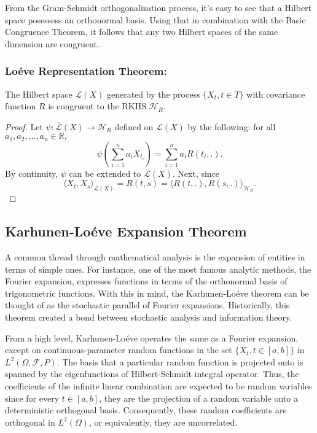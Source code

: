 \documentclass[psamsfonts]{amsart}
\theoremstyle{definition}
\theoremstyle{remark}
\numberwithin{equation}{section}
\begin{document}
From the Gram-Schmidt orthogonalization process, it's easy to see that a Hilbert space posessess an orthonormal basis. Using that in combination with the Basic Congruence Theorem, it follows that any two Hilbert spaces of the same dimension are congruent. 

\subsubsection{Lo\'{e}ve Representation Theorem:} The Hilbert space $\overline{\mathcal{L}} (X)$ generated by the process $\{ X_t, t \in T \}$ with covariance function $R$ is congruent to the RKHS $\mathcal{H}_R$. 

\begin{proof}
Let $\psi: \overline{\mathcal{L}} (X)\rightarrow \mathcal{H} _R$ defined on $\mathcal{L} (X)$ by the following: for all $a_1, a_2, \dots , a_n \in \mathbb{R},$
$$\psi \left( \sum ^n _{i = 1} a_i X_{t_i} \right) = \sum ^n _{i = 1} a_i R(t_i, .).$$
By continuity, $\psi$ can be extended to $\overline{\mathcal{L}} (X)$. Next, since 
$$\langle X_t, X_s \rangle _{\overline{\mathcal{L}} (X)} = R(t,s) = \langle R(t,.), R(s,.) \rangle _{\mathcal{H}_R}. $$
\end{proof}

\subsection{Karhunen-Lo\'{e}ve Expansion Theorem}
A common thread through mathematical analysis is the expansion of entities in terms of simple ones. For instance, one of the most famous analytic methods, the Fourier expansion, expresses functions in terms of the orthonormal basis of trigonometric functions. With this in mind, the Karhunen-Lo\'{e}ve theorem can be thought of as the stochastic parallel of Fourier expansions. Historically, this theorem created a bond between stochastic analysis and information theory. 

From a high level, Karhunen-Lo\'{e}ve operates the same as a Fourier expansion, except on continuous-parameter random functions in the set $\{ X_t , t \in [a, b] \}$ in $L^2 (\Omega, \mathcal{F}, P)$. The basis that a particular random function is projected onto is spanned by the eigenfunctions of Hilbert-Schmidt integral operator. Thus, the coefficients of the infinite linear combination are expected to be random variables since for every $t \in [a, b]$, they are the projection of a random variable onto a deterministic orthogonal basis. Consequently, these random coefficients are orthogonal in $L^2 (\Omega)$, or equivalently, they are uncorrelated. 
\end{document}
